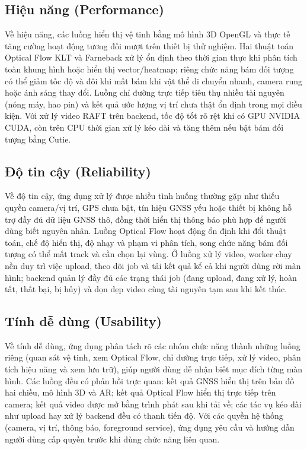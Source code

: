 \documentclass[../DoAn.tex]{subfiles}
\begin{document}
\subsection{Hiệu năng (Performance)}
\label{subsection:2.4.1}
Về hiệu năng, các luồng hiển thị vệ tinh bằng mô hình 3D OpenGL và thực tế tăng cường hoạt động tương đối mượt trên thiết bị thử nghiệm. Hai thuật toán Optical Flow KLT và Farneback xử lý ổn định theo thời gian thực khi phân tích toàn khung hình hoặc hiển thị vector/heatmap; riêng chức năng bám đối tượng có thể giảm tốc độ và đôi khi mất bám khi vật thể di chuyển nhanh, camera rung hoặc ánh sáng thay đổi. Luồng chỉ đường trực tiếp tiêu thụ nhiều tài nguyên (nóng máy, hao pin) và kết quả ước lượng vị trí chưa thật ổn định trong mọi điều kiện. Với xử lý video RAFT trên backend, tốc độ tốt rõ rệt khi có GPU NVIDIA CUDA, còn trên CPU thời gian xử lý kéo dài và tăng thêm nếu bật bám đối tượng bằng Cutie.

\subsection{Độ tin cậy (Reliability)}
\label{subsection:2.4.2}
Về độ tin cậy, ứng dụng xử lý được nhiều tình huống thường gặp như thiếu quyền camera/vị trí, GPS chưa bật, tín hiệu GNSS yếu hoặc thiết bị không hỗ trợ đầy đủ dữ liệu GNSS thô, đồng thời hiển thị thông báo phù hợp để người dùng biết nguyên nhân. Luồng Optical Flow hoạt động ổn định khi đổi thuật toán, chế độ hiển thị, độ nhạy và phạm vi phân tích, song chức năng bám đối tượng có thể mất track và cần chọn lại vùng. Ở luồng xử lý video, worker chạy nền duy trì việc upload, theo dõi job và tải kết quả kể cả khi người dùng rời màn hình; backend quản lý đầy đủ các trạng thái job (đang upload, đang xử lý, hoàn tất, thất bại, bị hủy) và dọn dẹp video cùng tài nguyên tạm sau khi kết thúc.

\subsection{Tính dễ dùng (Usability)}
\label{subsection:2.4.3}
Về tính dễ dùng, ứng dụng phân tách rõ các nhóm chức năng thành những luồng riêng (quan sát vệ tinh, xem Optical Flow, chỉ đường trực tiếp, xử lý video, phân tích hiệu năng và xem lưu trữ), giúp người dùng dễ nhận biết mục đích từng màn hình. Các luồng đều có phản hồi trực quan: kết quả GNSS hiển thị trên bản đồ hai chiều, mô hình 3D và AR; kết quả Optical Flow hiển thị trực tiếp trên camera; kết quả video được mở bằng trình phát sau khi tải về; các tác vụ kéo dài như upload hay xử lý backend đều có thanh tiến độ. Với các quyền hệ thống (camera, vị trí, thông báo, foreground service), ứng dụng yêu cầu và hướng dẫn người dùng cấp quyền trước khi dùng chức năng liên quan.
\end{document}
